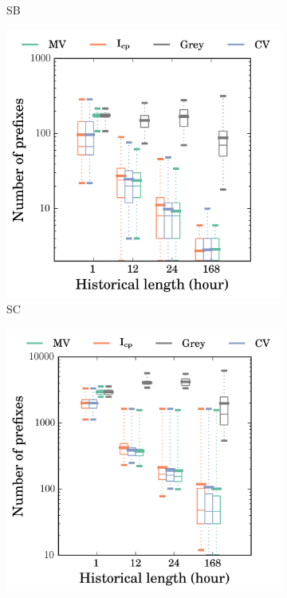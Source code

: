\begin{figure}
\begin{subfigure}[b]{0.48\textwidth}
                \caption{SB}
                \label{fig:churn_sb}
        \end{subfigure}
        \begin{subfigure}[b]{0.48\textwidth}
                \includegraphics[width=\textwidth]{gfx/chap2/grey_churn_box_method_compare_fs_sc.png}
                \caption{SC}
                \label{fig:churn_sc}
        \end{subfigure}
        \begin{subfigure}[b]{0.48\textwidth}
                \includegraphics[width=\textwidth]{gfx/chap2/grey_churn_box_method_compare_fs_sd.png}

\end{subfigure}
\end{figure}
